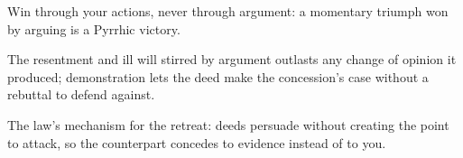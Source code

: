 

\begin{distilled}
  \item Win through your actions, never through argument: a momentary triumph won by arguing is a Pyrrhic victory.
  \item The resentment and ill will stirred by argument outlasts any change of opinion it produced; demonstration lets the deed make the concession's case without a rebuttal to defend against.
  \item The law's mechanism for the retreat: deeds persuade without creating the point to attack, so the counterpart concedes to evidence instead of to you.
\end{distilled}
